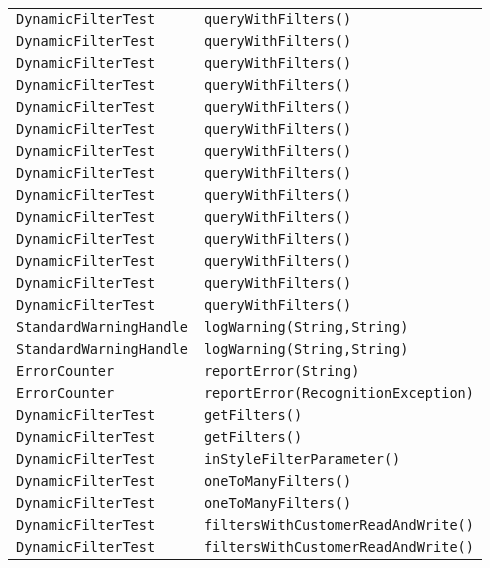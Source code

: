 \begin{center}
\begin{longtable}{ll}
\lstinline/DynamicFilterTest/&{\lstinline/queryWithFilters()/}\\
\lstinline/DynamicFilterTest/&{\lstinline/queryWithFilters()/}\\
\lstinline/DynamicFilterTest/&{\lstinline/queryWithFilters()/}\\
\lstinline/DynamicFilterTest/&{\lstinline/queryWithFilters()/}\\
\lstinline/DynamicFilterTest/&{\lstinline/queryWithFilters()/}\\
\lstinline/DynamicFilterTest/&{\lstinline/queryWithFilters()/}\\
\lstinline/DynamicFilterTest/&{\lstinline/queryWithFilters()/}\\
\lstinline/DynamicFilterTest/&{\lstinline/queryWithFilters()/}\\
\lstinline/DynamicFilterTest/&{\lstinline/queryWithFilters()/}\\
\lstinline/DynamicFilterTest/&{\lstinline/queryWithFilters()/}\\
\lstinline/DynamicFilterTest/&{\lstinline/queryWithFilters()/}\\
\lstinline/DynamicFilterTest/&{\lstinline/queryWithFilters()/}\\
\lstinline/DynamicFilterTest/&{\lstinline/queryWithFilters()/}\\
\lstinline/DynamicFilterTest/&{\lstinline/queryWithFilters()/}\\
\lstinline/StandardWarningHandle/&{\lstinline/logWarning(String,String)/}\\
\lstinline/StandardWarningHandle/&{\lstinline/logWarning(String,String)/}\\
\lstinline/ErrorCounter/&{\lstinline/reportError(String)/}\\
\lstinline/ErrorCounter/&{\lstinline/reportError(RecognitionException)/}\\
\lstinline/DynamicFilterTest/&{\lstinline/getFilters()/}\\
\lstinline/DynamicFilterTest/&{\lstinline/getFilters()/}\\
\lstinline/DynamicFilterTest/&{\lstinline/inStyleFilterParameter()/}\\
\lstinline/DynamicFilterTest/&{\lstinline/oneToManyFilters()/}\\
\lstinline/DynamicFilterTest/&{\lstinline/oneToManyFilters()/}\\
\lstinline/DynamicFilterTest/&{\lstinline/filtersWithCustomerReadAndWrite()/}\\
\lstinline/DynamicFilterTest/&{\lstinline/filtersWithCustomerReadAndWrite()/}\\

\end{longtable}
\end{center}
